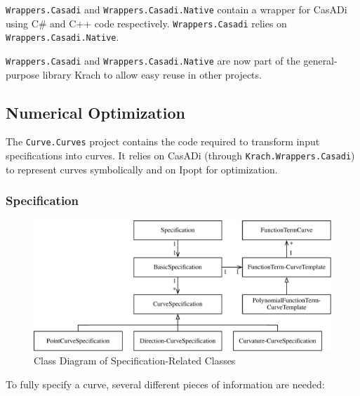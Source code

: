 \documentclass[a4paper]{article}
\begin{document}
				 \verb|Wrappers.Casadi| and \verb|Wrappers.Casadi.Native| contain a wrapper for CasADi using C\# and C++ code respectively. \verb|Wrappers.Casadi| relies on \verb|Wrappers.Casadi.Native|. 
				 
				 \verb|Wrappers.Casadi| and \verb|Wrappers.Casadi.Native| are now part of the general-purpose library Krach to allow easy reuse in other projects.
		
			\subsection{Numerical Optimization}
				The \verb|Curve.Curves| project contains the code required to transform input specifications into curves. It relies on CasADi (through \verb|Krach.Wrappers.Casadi|) to represent curves symbolically and on Ipopt for optimization.
			
				\subsubsection{Specification}
					\begin{figure}[htb]
						\centering
						\includegraphics[width=135mm]{content/output/specification_class_diagram.pdf}
						\caption{Class Diagram of Specification-Related Classes}
						\label{figure:specification_class_diagram}
					\end{figure}
				
					To fully specify a curve, several different pieces of information are needed:
				
\end{document}
